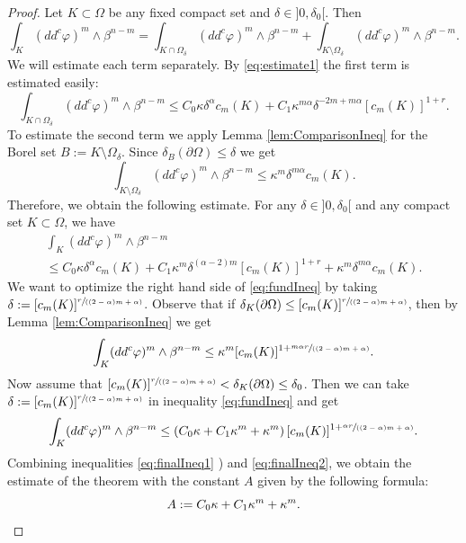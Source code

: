 \documentclass[JEP,XML,SOM,Unicode]{cedram}
\newcommand{\spfrac}[2]{\sfrac{#1}{(#2)}}
\theoremstyle{definition}
\begin{document}
\begin{proof}
Let $K \subset \Omega$ be any fixed compact set and $\delta\in{}]0,\delta_0[$. Then
\[
\int_K (dd^c\varphi)^m\wedge\beta^{n-m} = \int_{K \cap \Omega_\delta} (dd^c\varphi)^m\wedge\beta^{n-m} + \int_{K \setminus \Omega_\delta} (dd^c\varphi)^m\wedge\beta^{n-m}.
\]
We will estimate each term separately. By \eqref{eq:estimate1} the first term is estimated easily:
\[
\int_{K \cap \Omega_\delta} (dd^c\varphi)^m\wedge\beta^{n-m} \leq C_0 \kappa \delta^{\alpha} c_m (K) + C_1 \kappa^{m \alpha}\delta^{-2m + m \alpha} [c_m(K)]^{1+ r}.
\]
To estimate the second term we apply Lemma \ref{lem:ComparisonIneq} for the Borel set $ B:= K \setminus \Omega_\delta$. Since $\delta_B (\partial \Omega) \leq \delta$ we get
\[
\int_{K \setminus \Omega_\delta} (dd^c\varphi)^m\wedge\beta^{n-m} \leq \kappa^m \delta^{m \alpha} c_m (K).
\]
Therefore, we obtain the following estimate. For any $\delta\in{}]0,\delta_0[$ and any compact set $K \subset \Omega$, we have
\begin{multline} \label{eq:fundIneq}
\int_{K}(dd^c\varphi)^m\wedge\beta^{n-m}\\[-5pt]
\leq C_0 \kappa \delta^{\alpha} c_m (K) + C_1 \kappa^m \delta^{(\alpha -2) m } [c_m(K)]^{1+ r} + \kappa^m \delta^{m \alpha} c_m (K).
\end{multline}
We want to optimize the right hand side of \eqref{eq:fundIneq} by taking $\delta:= [c_m (K)]^{\spfrac{r}{(2-\alpha) m + \alpha}}$. Observe that if $ \delta_K(\partial \Omega) \leq [c_m (K)]^{\spfrac{r}{(2-\alpha) m + \alpha}}$, then by Lemma \ref{lem:ComparisonIneq} we get
\begin{equation} \label{eq:finalIneq1}
\int_{K}(dd^c\varphi)^m\wedge\beta^{n-m} \leq \kappa^m [c_m (K)]^{1 + \spfrac{m \alpha r}{(2-\alpha) m + \alpha}}.
\end{equation}
Now assume that $ [c_m (K)]^{\spfrac{r}{(2-\alpha) m + \alpha}} < \delta_K (\partial \Omega) \leq \delta_0$. Then we can take $\delta:= [c_m (K)]^{\spfrac{r}{(2-\alpha) m + \alpha}}$ in inequality \eqref{eq:fundIneq} and get
\begin{equation}\label{eq:finalIneq2}
\int_{K}(dd^c\varphi)^m\wedge\beta^{n-m} \leq (C_0 \kappa + C_1 \kappa^m + \kappa^m) \, [c_m (K)]^{1 + \spfrac{\alpha r}{(2-\alpha) m + \alpha}}.
\end{equation}
Combining inequalities \eqref{eq:finalIneq1} ) and \eqref{eq:finalIneq2}, we obtain the estimate of the theorem with the constant $A$ given by the following formula:
\begin{equation} \label{eq:finalConst}
A:= C_0 \kappa + C_1 \kappa^m + \kappa^m.\qedhere
\end{equation}
\end{proof}
\end{document}

